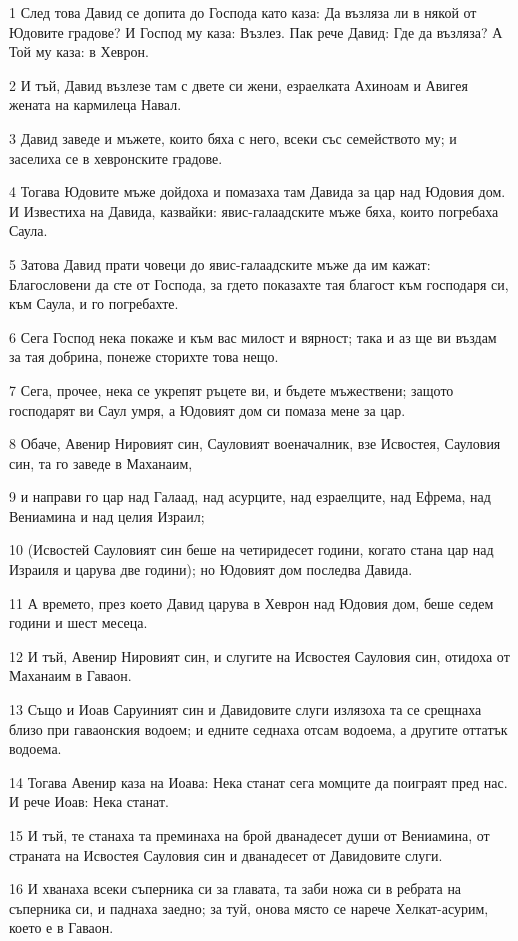 \par 1 След това Давид се допита до Господа като каза: Да възляза ли в някой от Юдовите градове? И Господ му каза: Възлез. Пак рече Давид: Где да възляза? А Той му каза: в Хеврон.
\par 2 И тъй, Давид възлезе там с двете си жени, езраелката Ахиноам и Авигея жената на кармилеца Навал.
\par 3 Давид заведе и мъжете, които бяха с него, всеки със семейството му; и заселиха се в хевронските градове.
\par 4 Тогава Юдовите мъже дойдоха и помазаха там Давида за цар над Юдовия дом. И Известиха на Давида, казвайки: явис-галаадските мъже бяха, които погребаха Саула.
\par 5 Затова Давид прати човеци до явис-галаадските мъже да им кажат: Благословени да сте от Господа, за гдето показахте тая благост към господаря си, към Саула, и го погребахте.
\par 6 Сега Господ нека покаже и към вас милост и вярност; така и аз ще ви въздам за тая добрина, понеже сторихте това нещо.
\par 7 Сега, прочее, нека се укрепят ръцете ви, и бъдете мъжествени; защото господарят ви Саул умря, а Юдовият дом си помаза мене за цар.
\par 8 Обаче, Авенир Нировият син, Сауловият военачалник, взе Исвостея, Сауловия син, та го заведе в Маханаим,
\par 9 и направи го цар над Галаад, над асурците, над езраелците, над Ефрема, над Вениамина и над целия Израил;
\par 10 (Исвостей Сауловият син беше на четиридесет години, когато стана цар над Израиля и царува две години); но Юдовият дом последва Давида.
\par 11 А времето, през което Давид царува в Хеврон над Юдовия дом, беше седем години и шест месеца.
\par 12 И тъй, Авенир Нировият син, и слугите на Исвостея Сауловия син, отидоха от Маханаим в Гаваон.
\par 13 Също и Иоав Саруиният син и Давидовите слуги излязоха та се срещнаха близо при гаваонския водоем; и едните седнаха отсам водоема, а другите оттатък водоема.
\par 14 Тогава Авенир каза на Иоава: Нека станат сега момците да поиграят пред нас. И рече Иоав: Нека станат.
\par 15 И тъй, те станаха та преминаха на брой дванадесет души от Вениамина, от страната на Исвостея Сауловия син и дванадесет от Давидовите слуги.
\par 16 И хванаха всеки съперника си за главата, та заби ножа си в ребрата на съперника си, и паднаха заедно; за туй, онова място се нарече Хелкат-асурим, което е в Гаваон.
